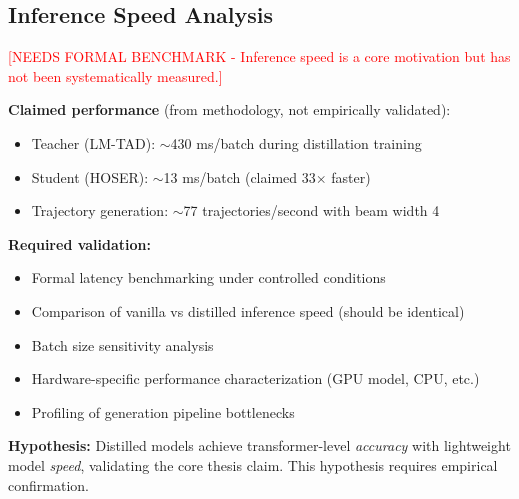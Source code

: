 \subsection{Inference Speed Analysis}
\label{sec:eval-inference}

\textcolor{red}{[NEEDS FORMAL BENCHMARK - Inference speed is a core motivation but has not been systematically measured.]}

\textbf{Claimed performance} (from methodology, not empirically validated):
\begin{itemize}[noitemsep,topsep=0pt]
    \item Teacher (LM-TAD): $\sim$430 ms/batch during distillation training
    \item Student (HOSER): $\sim$13 ms/batch (claimed 33$\times$ faster)
    \item Trajectory generation: $\sim$77 trajectories/second with beam width 4
\end{itemize}

\textbf{Required validation:}
\begin{itemize}[noitemsep,topsep=0pt]
    \item Formal latency benchmarking under controlled conditions
    \item Comparison of vanilla vs distilled inference speed (should be identical)
    \item Batch size sensitivity analysis
    \item Hardware-specific performance characterization (GPU model, CPU, etc.)
    \item Profiling of generation pipeline bottlenecks
\end{itemize}

\textbf{Hypothesis:} Distilled models achieve transformer-level \emph{accuracy} with lightweight model \emph{speed}, validating the core thesis claim. This hypothesis requires empirical confirmation.



